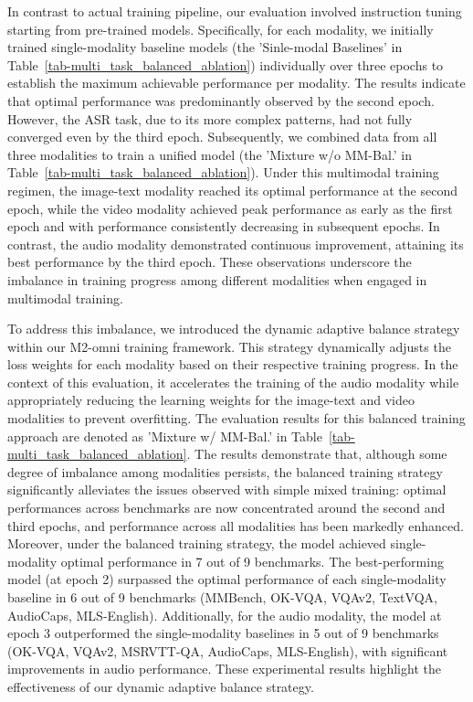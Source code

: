 In contrast to actual training pipeline, our evaluation involved instruction tuning starting from pre-trained models. Specifically, for each modality, we initially trained single-modality baseline models (the 'Sinle-modal Baselines' in Table~\ref{tab-multi_task_balanced_ablation}) individually over three epochs to establish the maximum achievable performance per modality. The results indicate that optimal performance was predominantly observed by the second epoch. However, the ASR task, due to its more complex patterns, had not fully converged even by the third epoch. Subsequently, we combined data from all three modalities to train a unified model (the 'Mixture w/o MM-Bal.' in Table~\ref{tab-multi_task_balanced_ablation}). Under this multimodal training regimen, the image-text modality reached its optimal performance at the second epoch, while the video modality achieved peak performance as early as the first epoch and with performance consistently decreasing in subsequent epochs. In contrast, the audio modality demonstrated continuous improvement, attaining its best performance by the third epoch. These observations underscore the imbalance in training progress among different modalities when engaged in multimodal training.

To address this imbalance, we introduced the dynamic adaptive balance strategy within our M2-omni training framework. This strategy dynamically adjusts the loss weights for each modality based on their respective training progress. In the context of this evaluation, it accelerates the training of the audio modality while appropriately reducing the learning weights for the image-text and video modalities to prevent overfitting. The evaluation results for this balanced training approach are denoted as 'Mixture w/ MM-Bal.' in Table~\ref{tab-multi_task_balanced_ablation}. The results demonstrate that, although some degree of imbalance among modalities persists, the balanced training strategy significantly alleviates the issues observed with simple mixed training: optimal performances across benchmarks are now concentrated around the second and third epochs, and performance across all modalities has been markedly enhanced. Moreover, under the balanced training strategy, the model achieved single-modality optimal performance in 7 out of 9 benchmarks. The best-performing model (at epoch 2) surpassed the optimal performance of each single-modality baseline in 6 out of 9 benchmarks (MMBench, OK-VQA, VQAv2, TextVQA, AudioCaps, MLS-English). Additionally, for the audio modality, the model at epoch 3 outperformed the single-modality baselines in 5 out of 9 benchmarks (OK-VQA, VQAv2, MSRVTT-QA, AudioCaps, MLS-English), with significant improvements in audio performance. These experimental results highlight the effectiveness of our dynamic adaptive balance strategy.
